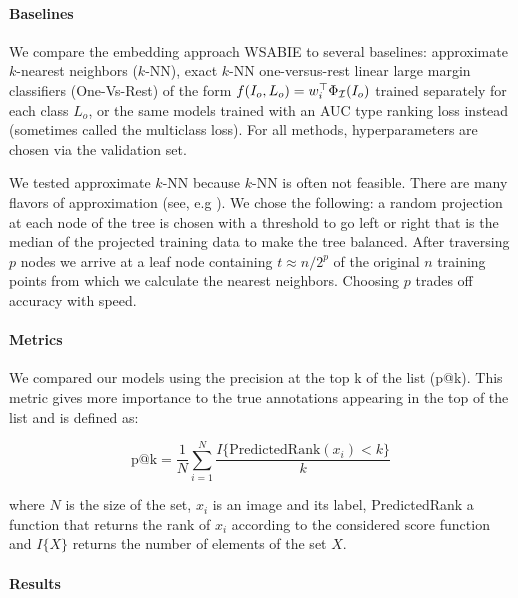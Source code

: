 \paragraph{Baselines}

We compare the embedding approach WSABIE
to several baselines: 
approximate $k$-nearest neighbors ($k$-NN),  exact $k$-NN
one-versus-rest linear large margin classifiers (One-Vs-Rest) of the form 
$f(I_o, L_o) = w_i^\top  \Phi_{\cal I}(I_o)$ trained separately for each class $L_o$,
or the same models trained with an AUC type ranking loss instead (sometimes called the multiclass loss).
For all methods, hyperparameters are chosen via the validation set.


We tested approximate $k$-NN because $k$-NN is often not feasible. There are many
flavors of approximation (see, e.g \citep{Fergus:small_codes}). We chose the following: 
a random projection at each node of the tree is chosen
with a threshold to go left or right that is the median of the projected training data to make the tree 
balanced. After traversing $p$ nodes we arrive at a leaf node containing
$ t \approx n/2^p  $ of the original $n$ training points from which we calculate the nearest neighbors. 
Choosing $p$ trades off accuracy with speed.

\paragraph{Metrics}

We compared our models using the precision at the top k of the list
(p@k). This metric gives more
importance to the true annotations appearing in the top of the list and is defined as:

\[
  \textrm{p@k} = \frac{1}{N} \sum_{i=1}^{N} \dfrac{I\{\textrm{PredictedRank}(x_i)< k\}}{k}
\]

where $N$ is the size of the set, $x_i$ is an image and its label, PredictedRank
a function that returns the rank of $x_i$ according to the considered
score function and $I\{X\}$ returns the number of elements of the set $X$.

\paragraph{Results}

